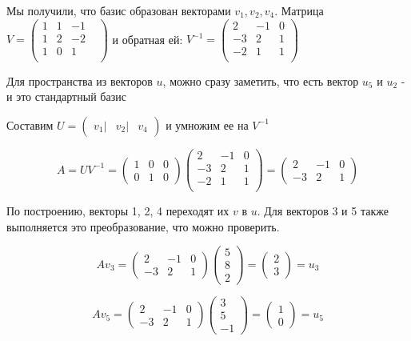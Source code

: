 \documentclass[a4paper,12pt]{article}
\begin{document}
\begin{enumerate}
Мы получили, что базис образован векторами $v_1, v_2, v_4$.
Матрица $V=\begin{pmatrix}
1&1&-1\\
1&2&-2\\
1&0&1&\\
\end{pmatrix}$ и обратная ей: $V^{-1} = \begin{pmatrix}
2&-1&0\\
-3&2&1\\
-2&1&1\\
\end{pmatrix}$

Для пространства из векторов $u$, можно сразу заметить, что есть вектор $u_5$ и $u_2$ - и это стандартный базис


Составим $U = \begin{pmatrix}
v_1|& v_2|& v_4
\end{pmatrix}$
и умножим ее на $V^{-1}$

$$A=UV^{-1}=\begin{pmatrix}
1&0&0\\
0&1&0
\end{pmatrix}
\begin{pmatrix}
2&-1&0\\
-3&2&1\\
-2&1&1\\
\end{pmatrix}=\begin{pmatrix}
2&-1&0\\
-3&2&1
\end{pmatrix}$$
 
По построению, векторы 1, 2, 4 переходят их $v$ в $u$. Для векторов 3 и 5 также выполняется это преобразование, что можно проверить.

$$Av_3 =\begin{pmatrix}
2&-1&0\\
-3&2&1
\end{pmatrix}\begin{pmatrix}
{5}\\{8}\\{2}
\end{pmatrix}=\begin{pmatrix}
{2}\\{3}
\end{pmatrix}=u_3$$

$$Av_5 =\begin{pmatrix}
2&-1&0\\
-3&2&1
\end{pmatrix}\begin{pmatrix}
{3}\\{5}\\{-1}
\end{pmatrix}=\begin{pmatrix}
{1}\\{0}
\end{pmatrix}=u_5$$



\end{enumerate}
\end{document}
